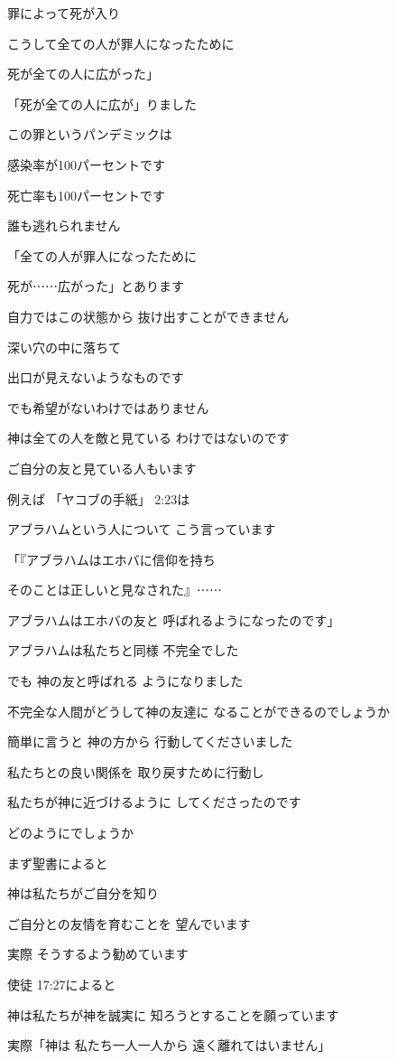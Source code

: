\documentclass[twocolumn]{jsarticle}
\begin{document}
罪によって死が入り

こうして全ての人が罪人になったために

死が全ての人に広がった」

「死が全ての人に広が」りました

この罪というパンデミックは

感染率が100パーセントです

死亡率も100パーセントです

誰も逃れられません

「全ての人が罪人になったために

死が⋯⋯広がった」とあります

自力ではこの状態から
抜け出すことができません

深い穴の中に落ちて

出口が見えないようなものです

でも希望がないわけではありません

神は全ての人を敵と見ている
わけではないのです

ご自分の友と見ている人もいます

例えば 「ヤコブの手紙」 2:23は

アブラハムという人について
こう言っています

「『アブラハムはエホバに信仰を持ち

そのことは正しいと見なされた』⋯⋯

アブラハムはエホバの友と
呼ばれるようになったのです」

アブラハムは私たちと同様
不完全でした

でも 神の友と呼ばれる
ようになりました

不完全な人間がどうして神の友達に
なることができるのでしょうか

簡単に言うと 神の方から
行動してくださいました

私たちとの良い関係を
取り戻すために行動し

私たちが神に近づけるように
してくださったのです

どのようにでしょうか

まず聖書によると

神は私たちがご自分を知り

ご自分との友情を育むことを
望んでいます

実際 そうするよう勧めています

使徒 17:27によると

神は私たちが神を誠実に
知ろうとすることを願っています

実際「神は 私たち一人一人から
遠く離れてはいません」
\end{document}
